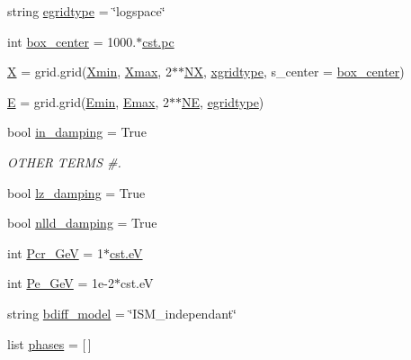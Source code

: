 \begin{DoxyCompactItemize}
string \hyperlink{namespacenamelist_ae5aac93882db9b7885d5e7be1d4012e0}{egridtype} = \char`\"{}logspace\char`\"{}
\item 
int \hyperlink{namespacenamelist_a364797b64f69de89c19410bc987ce594}{box\+\_\+center} = 1000.$\ast$\hyperlink{constants_8h_a2884cd030c4c825754349a525a1d06ce}{cst.\+pc}
\item 
\hyperlink{namespacenamelist_af0c918988527847f8c4d92e5dd09cde0}{X} = grid.\+grid(\hyperlink{namespacenamelist_a512ba0df866fdbf44bfdd6dab3846aba}{Xmin}, \hyperlink{namespacenamelist_a9b5f75b28f87c2258e7f52b41cabcd8f}{Xmax}, 2$\ast$$\ast$\hyperlink{namespacenamelist_ac228fb8e42706311969779d134433edd}{NX}, \hyperlink{namespacenamelist_aa070f33430efb3ee85a15f4c91b8165f}{xgridtype}, s\+\_\+center = \hyperlink{namespacenamelist_a364797b64f69de89c19410bc987ce594}{box\+\_\+center})
\item 
\hyperlink{namespacenamelist_a732e08e1d7e605a46b2db15805f34db0}{E} = grid.\+grid(\hyperlink{namespacenamelist_ad0f5eea37fb1092519d3ebfe3478ccc1}{Emin}, \hyperlink{namespacenamelist_a5262c7aab8333b9071ce73b63781ff32}{Emax}, 2$\ast$$\ast$\hyperlink{namespacenamelist_a372892989a797e9c3b759f023e878e4d}{NE}, \hyperlink{namespacenamelist_ae5aac93882db9b7885d5e7be1d4012e0}{egridtype})
\item 
bool \hyperlink{namespacenamelist_aa778a21b3efefbbb6cbb975a4e3ae44a}{in\+\_\+damping} = True
\begin{DoxyCompactList}\small\item\em O\+T\+H\+ER T\+E\+R\+MS \#. \end{DoxyCompactList}\item 
bool \hyperlink{namespacenamelist_a4a059858993c6b318e3c3891b92bfcf0}{lz\+\_\+damping} = True
\item 
bool \hyperlink{namespacenamelist_aac0b337423bdaaea56856bb5a89e15a2}{nlld\+\_\+damping} = True
\item 
int \hyperlink{namespacenamelist_ab28dd7611ffee8004e268e4d93275bcb}{Pcr\+\_\+GeV} = 1$\ast$\hyperlink{constants_8h_a87b385f118e3715860117a77eda7136d}{cst.\+eV}
\item 
int \hyperlink{namespacenamelist_a83c2ee01fb8fd7ad708be6fcde5ff530}{Pe\+\_\+GeV} = 1e-\/2$\ast$cst.\+eV
\item 
string \hyperlink{namespacenamelist_ac444a9ea5d6ffb31f9fa075f27b1f226}{bdiff\+\_\+model} = \char`\"{}I\+S\+M\+\_\+independant\char`\"{}
\item 
list \hyperlink{namespacenamelist_a088873ff7532d7c6df70ef89db73afb3}{phases} = \mbox{[}$\,$\mbox{]}

\end{DoxyCompactItemize}
